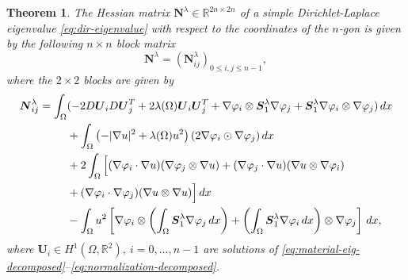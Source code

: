 \documentclass[11pt]{article}
\numberwithin{equation}{section}\newtheorem*{jepEnonce}{\jepEnonceTitle}\newenvironment{enonce*}[1]{\def\jepEnonceTitle{#1}\jepEnonce}{\endjepEnonce}\newtheorem*{conj*}{Conjecture}
\theoremstyle{plain}
\newtheorem{thm}{Theorem}[section]
\theoremstyle{definition}
\newcommand{\bo}[1]{{\boldsymbol#1}}
\let\Bbb\mathbb
\begin{document}
\begin{thm} The Hessian matrix $\bo N^\lambda \in \Bbb{R}^{2n\times 2n}$ of a simple Dirichlet-Laplace eigenvalue \eqref{eq:dir-eigenvalue} with respect to the coordinates of the $n$-gon is given by the following $n\times n$ block matrix
\[
\bo N^\lambda = (\bo N_{ij}^\lambda)_{0\leq i,j\leq n-1},
\]
where the $2\times 2$ blocks are given by
\begin{align}\label{eq:Hessian-lambda-block}
\bo N_{ij}^\lambda = \int_\Omega& (-2D \bo U_i D \bo U_j^T+ 2\lambda(\Omega) \bo U_i \bo U_j^T + \nabla \varphi_i \otimes \bo S_1^\lambda \nabla \varphi_j + \bo S_1^\lambda \nabla \varphi_i \otimes \nabla \varphi_j)\, dx \notag \\
& +\int_\Omega \left(-|\nabla u|^2+\lambda(\Omega) u^2\right) (2 \nabla \varphi_i \odot \nabla \varphi_j) \, dx \notag \\
& +2\int_\Omega \Big[(\nabla \varphi_i\cdot \nabla u)(\nabla \varphi_j \otimes \nabla u)+(\nabla \varphi_j \cdot \nabla u)(\nabla u \otimes \nabla \varphi_i) \\
&+(\nabla \varphi_i \cdot \nabla \varphi_j)(\nabla u \otimes \nabla u)\Big] \, dx\notag \\
& - \int_\Omega u^2\left[\nabla \varphi_i \otimes \left(\int_\Omega \bo S_1^\lambda \nabla \varphi_j \, dx \right)+
\left(\int_\Omega \bo S_1^\lambda \nabla \varphi_i\, dx\right)\otimes \nabla \varphi_j \right]\, dx, \notag
\end{align}
where $\bo U_i \in H^1(\Omega,\Bbb{R}^2),\ i=0,\dots,n-1$ are solutions of \eqref{eq:material-eig-decomposed}--\eqref{eq:normalization-decomposed}.
\label{thm:hessian-eig}
\end{thm}
\end{document}

